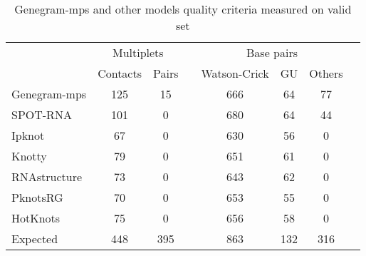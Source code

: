 \begin{table}[h!]
\centering
\caption{Genegram-mps and other models quality criteria measured on valid set}
\begin{tabular}{@{}lccccccc@{}}\toprule
& \multicolumn{2}{c}{Multiplets} & \phantom{abc}& \multicolumn{3}{c}{Base pairs} \\
& Contacts & Pairs  && Watson-Crick & GU & Others \\ \cmidrule{2-3} \cmidrule{5-7} 
Genegram-mps  & 125 & 15 && 666 & 64 & 77 \\
SPOT-RNA & 101 & 0 && 680 & 64 & 44 \\
Ipknot & 67 & 0 && 630 & 56 & 0 \\
Knotty & 79 & 0 && 651 & 61 & 0 \\
RNAstructure & 73 & 0 && 643 & 62 & 0 \\
PknotsRG & 70 & 0 && 653 & 55 & 0 \\
HotKnots & 75 & 0 && 656 & 58 & 0 \\
\bottomrule
Expected & 448 & 395 && 863 & 132 & 316 \\
\bottomrule
\end{tabular}
\label{table_mps}
\end{table}